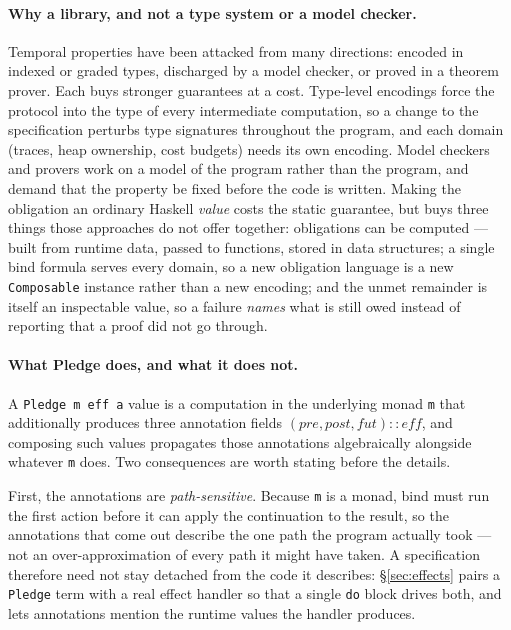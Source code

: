 \documentclass[acmsmall,screen]{acmart}
\newcommand{\pre}{\mathit{pre}}
\newcommand{\post}{\mathit{post}}
\newcommand{\fut}{\mathit{fut}}
\begin{document}
\paragraph{Why a library, and not a type system or a model checker.}
Temporal properties have been attacked from many directions: encoded in
indexed or graded types, discharged by a model checker, or proved in a
theorem prover.
Each buys stronger guarantees at a cost.
Type-level encodings force the protocol into the type of every
intermediate computation, so a change to the specification perturbs
type signatures throughout the program, and each domain (traces, heap
ownership, cost budgets) needs its own encoding.
Model checkers and provers work on a model of the program rather than the
program, and demand that the property be fixed before the code is written.
Making the obligation an ordinary Haskell \emph{value} costs the static
guarantee, but buys three things those approaches do not offer together:
obligations can be computed --- built from runtime data, passed to
functions, stored in data structures;
a single bind formula serves every domain, so a new obligation language is
a new \lstinline{Composable} instance rather than a new encoding;
and the unmet remainder is itself an inspectable value, so a failure
\emph{names} what is still owed instead of reporting that a proof did not
go through.

\paragraph{What Pledge does, and what it does not.}
A \lstinline{Pledge m eff a} value is a computation in the underlying monad
\lstinline{m} that additionally produces three annotation fields
$(\pre, \post, \fut) :: \mathit{eff}$, and composing such values propagates
those annotations algebraically alongside whatever \lstinline{m} does.
Two consequences are worth stating before the details.

First, the annotations are \emph{path-sensitive}.
Because \lstinline{m} is a monad, bind must run the first action before it
can apply the continuation to the result, so the annotations that come out
describe the one path the program actually took --- not an
over-approximation of every path it might have taken.
A specification therefore need not stay detached from the code it
describes: \S\ref{sec:effects} pairs a \lstinline{Pledge} term with a real
effect handler so that a single \lstinline{do} block drives both, and lets
annotations mention the runtime values the handler produces.
\end{document}
